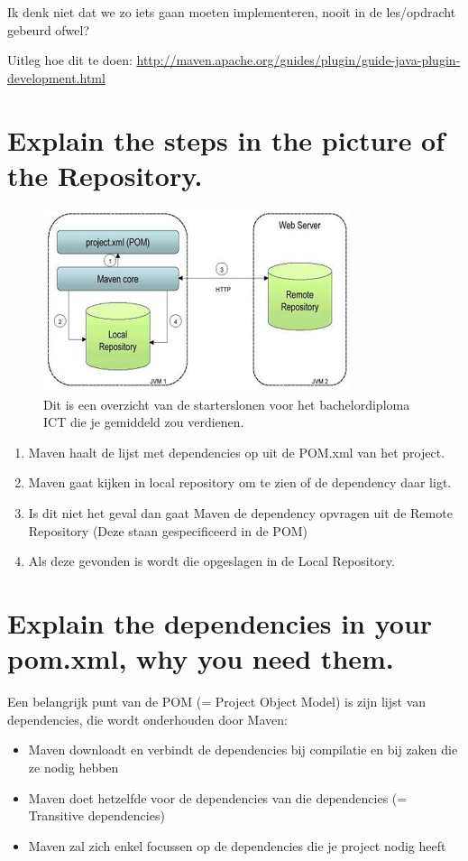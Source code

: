 Ik denk niet dat we zo iets gaan moeten implementeren, nooit in de les/opdracht gebeurd ofwel?

Uitleg hoe dit te doen: 
\url{http://maven.apache.org/guides/plugin/guide-java-plugin-development.html}

\section{Explain the steps in the picture of the Repository.}


\begin{figure}[tbph!]
	\centering
	\includegraphics[width=9cm]{images/mavenoverzicht}
	\caption[Startersloon overzicht voor bachelor diploma ICT]{Dit is een overzicht van de starterslonen voor het bachelordiploma ICT die je gemiddeld zou verdienen.}
	\label{fig:startersloonictbachelor}
\end{figure}

\begin{enumerate}
	\item Maven haalt de lijst met dependencies op uit de POM.xml van het project.
	\item Maven gaat kijken in local repository om te zien of de dependency daar ligt.
	\item Is dit niet het geval dan gaat Maven de dependency opvragen uit de Remote Repository (Deze staan gespecificeerd in de POM)
	\item Als deze gevonden is wordt die opgeslagen in de Local Repository.
\end{enumerate}

\section{Explain the dependencies in your pom.xml, why you need them.}
Een belangrijk punt van de POM (= Project Object Model) is zijn lijst van dependencies, die wordt onderhouden door Maven:
\begin{itemize}
\item Maven downloadt en verbindt de dependencies bij compilatie en bij zaken die ze nodig hebben
\item Maven doet hetzelfde voor de dependencies van die dependencies (= Transitive dependencies)
\item Maven zal zich enkel focussen op de dependencies die je project nodig heeft
\end{itemize}
